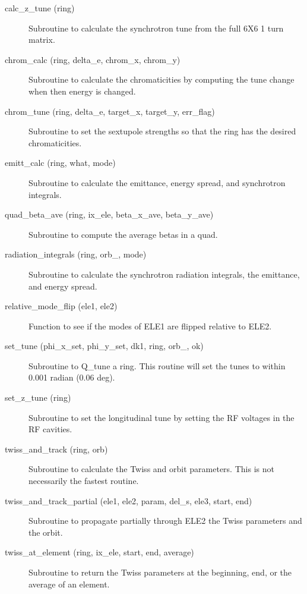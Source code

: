 \begin{description}

\item[calc\_z\_tune (ring)] \Newline
Subroutine to calculate the synchrotron tune from the full 6X6 1 turn matrix. 

\item[chrom\_calc (ring, delta\_e, chrom\_x, chrom\_y)] \Newline
Subroutine to calculate the chromaticities by computing the tune 
change when then energy is changed. 

\item[chrom\_tune (ring, delta\_e, target\_x, target\_y, err\_flag)] \Newline
Subroutine to set the sextupole strengths so that the ring 
has the desired chromaticities. 

\item[emitt\_calc (ring, what, mode)] \Newline
Subroutine to calculate the emittance, energy spread, and synchrotron integrals. 

\item[quad\_beta\_ave (ring, ix\_ele, beta\_x\_ave, beta\_y\_ave)] \Newline
Subroutine to compute the average betas in a quad.

\item[radiation\_integrals (ring, orb\_, mode)] \Newline
Subroutine to calculate the synchrotron radiation integrals, the emittance, and energy spread. 

\item[relative\_mode\_flip (ele1, ele2)] \Newline
Function to see if the modes of ELE1 are flipped relative to ELE2. 

\item[set\_tune (phi\_x\_set, phi\_y\_set, dk1, ring, orb\_, ok)] \Newline
Subroutine to Q\_tune a ring. This routine will set the tunes to within 0.001 radian (0.06 deg). 

\item[set\_z\_tune (ring)] \Newline
Subroutine to set the longitudinal tune by setting the RF voltages in the RF cavities. 

\item[twiss\_and\_track (ring, orb)] \Newline
Subroutine to calculate the Twiss and orbit parameters. 
This is not necessarily the fastest routine. 

\item[twiss\_and\_track\_partial (ele1, ele2, param, del\_s, ele3, start, end)] \Newline
Subroutine to propagate partially through ELE2 the Twiss parameters and the orbit. 

\item[twiss\_at\_element (ring, ix\_ele, start, end, average)] \Newline
Subroutine to return the Twiss parameters at the beginning, end, or the average of an element. 


\end{description}
